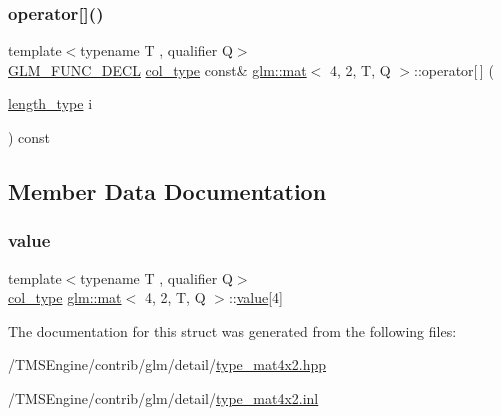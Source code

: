 \mbox{\label{structglm_1_1mat_3_014_00_012_00_01_t_00_01_q_01_4_a93bfd9601db1127f3204daa428f627e6}} 
\subsubsection{\texorpdfstring{operator[]()}{operator[]()}\hspace{0.1cm}{\footnotesize\ttfamily [2/2]}}
{\footnotesize\ttfamily template$<$typename T , qualifier Q$>$ \\
\hyperlink{setup_8hpp_ab2d052de21a70539923e9bcbf6e83a51}{G\+L\+M\+\_\+\+F\+U\+N\+C\+\_\+\+D\+E\+CL} \hyperlink{structglm_1_1mat_3_014_00_012_00_01_t_00_01_q_01_4_a60138ab077eb3bef96e654e672af5059}{col\+\_\+type} const\& \hyperlink{structglm_1_1mat}{glm\+::mat}$<$ 4, 2, T, Q $>$\+::operator\mbox{[}$\,$\mbox{]} (\begin{DoxyParamCaption}\item[{\hyperlink{structglm_1_1mat_3_014_00_012_00_01_t_00_01_q_01_4_a4b192a2630331f70ca61657d9783026e}{length\+\_\+type}}]{i }\end{DoxyParamCaption}) const}



\subsection{Member Data Documentation}
\mbox{\label{structglm_1_1mat_3_014_00_012_00_01_t_00_01_q_01_4_aa505bcd34286dbc23f599a6510908853}} 
\subsubsection{\texorpdfstring{value}{value}}
{\footnotesize\ttfamily template$<$typename T , qualifier Q$>$ \\
\hyperlink{structglm_1_1mat_3_014_00_012_00_01_t_00_01_q_01_4_a60138ab077eb3bef96e654e672af5059}{col\+\_\+type} \hyperlink{structglm_1_1mat}{glm\+::mat}$<$ 4, 2, T, Q $>$\+::\hyperlink{_s_d_l__opengl__glext_8h_a8ad81492d410ff2ac11f754f4042150f}{value}\mbox{[}4\mbox{]}\hspace{0.3cm}{\ttfamily [private]}}



The documentation for this struct was generated from the following files\+:\begin{DoxyCompactItemize}
\item 
/\+T\+M\+S\+Engine/contrib/glm/detail/\hyperlink{type__mat4x2_8hpp}{type\+\_\+mat4x2.\+hpp}\item 
/\+T\+M\+S\+Engine/contrib/glm/detail/\hyperlink{type__mat4x2_8inl}{type\+\_\+mat4x2.\+inl}\end{DoxyCompactItemize}
